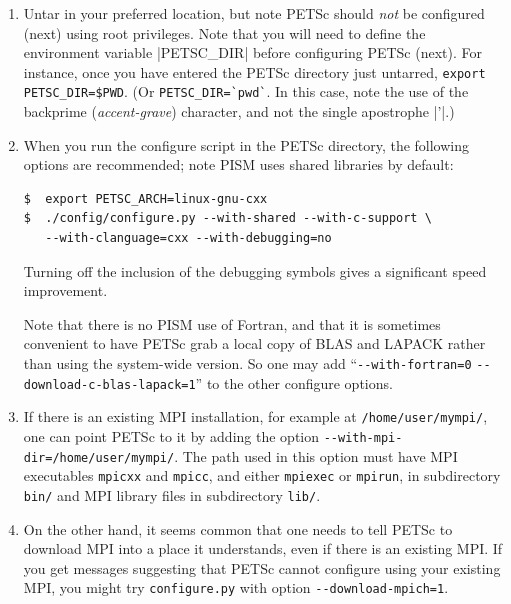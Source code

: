 \documentclass[11pt,final]{amsart}
\newcommand{\und}{\_\!\_}
\begin{document}
\begin{enumerate}
\renewcommand{\labelenumii}{(\roman{enumii})}\begin{enumerate}
\item Untar in your preferred location, but note PETSc should \emph{not} be configured (next) using root privileges. Note that you
  will need to define the environment variable |PETSC_DIR|\index{PETSC\und DIR} before configuring PETSc (next). For instance,
  once you have entered the PETSc directory just untarred, \verb|export PETSC_DIR=$PWD|. (Or \verb|PETSC_DIR=`pwd`|. In this case,
  note the use of the backprime (\emph{accent-grave}) character, and not the single apostrophe |'|.)

\item When you run the configure script in the PETSc directory, the following options are recommended; note PISM uses shared
  libraries by default:\index{PETSC\und ARCH}
\begin{verbatim}
$  export PETSC_ARCH=linux-gnu-cxx
$  ./config/configure.py --with-shared --with-c-support \
   --with-clanguage=cxx --with-debugging=no
\end{verbatim}

Turning off the inclusion of the debugging symbols gives a significant speed improvement.

Note that there is no PISM use of Fortran, and that it is sometimes convenient to have PETSc grab a local copy of BLAS and LAPACK rather than using the system-wide version.  So one may add ``\verb|--with-fortran=0| \verb|--download-c-blas-lapack=1|'' to the other configure options.

\item If there is an existing MPI installation, for example at \verb|/home/user/mympi/|, one can point PETSc to it by adding the option \verb|--with-mpi-dir=/home/user/mympi/|.  The path used in this option must have MPI executables \verb|mpicxx| and \verb|mpicc|, and either \verb|mpiexec| or \verb|mpirun|, in subdirectory \verb|bin/| and MPI library files in subdirectory \verb|lib/|.

\item On the other hand, it seems common that one needs to tell PETSc to download MPI into a place it understands, even if there is an existing MPI.  If you get messages suggesting that PETSc cannot configure using your existing MPI, you might try \verb|configure.py| with option \verb|--download-mpich=1|.


\end{enumerate}
\end{enumerate}
\end{document}
